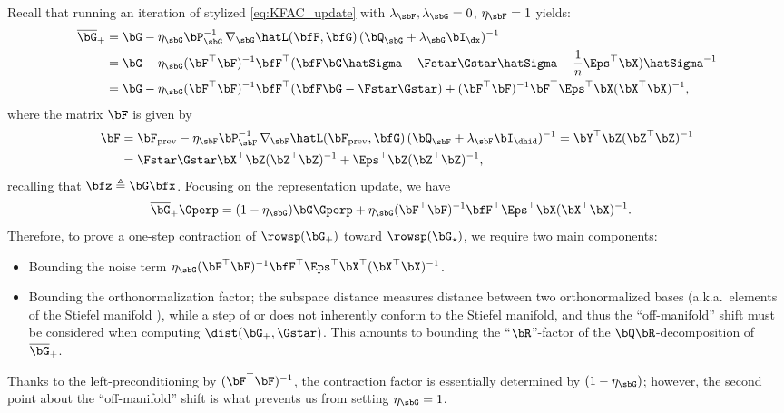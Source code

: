 Recall that running an iteration of stylized \KFAC \eqref{eq:KFAC_update} with $\lambda_\sbF, \lambda_\sbG = 0$, $\eta_\sbF = 1$ yields:
\begin{align}
\begin{split}\label{eq:expanding_KFAC_update}
    \overline\bG_+ &= \bG - \eta_{\sbG} \bP_\sbG^{-1}\, \nabla_{\sbG} \hatL(\bfF, \bfG)\, (\bQ_\sbG + \lambda_\sbG \bI_{\dx})^{-1} \\
    &= \bG - \eta_\sbG (\bF^\top \bF)^{-1}\bfF^\top (\bfF \bG \hatSigma - \Fstar \Gstar \hatSigma - \frac{1}{n}\Eps^\top \bX ) \hatSigma^{-1} \\
    &= \bG - \eta_\sbG (\bF^\top \bF)^{-1}\bfF^\top (\bfF \bG - \Fstar \Gstar) + (\bF^\top \bF)^{-1}\bF^\top\Eps^\top \bX (\bX^\top \bX)^{-1},
\end{split} 
\end{align}
where the matrix $\bF$ is given by
\begin{align*}
        \bF &= \bF_{\rm{prev}} - \eta_\sbF \bP_\sbF^{-1}\, \nabla_\sbF \hatL(\bF_{\rm{prev}}, \bfG)\, (\bQ_{\sbF}+\lambda_\sbF \bI_{\dhid})^{-1} = \bY^\top \bZ (\bZ^\top \bZ)^{-1} \\
        &= \Fstar \Gstar \bX^\top \bZ (\bZ^\top \bZ)^{-1} + \Eps^\top \bZ (\bZ^\top \bZ)^{-1},
\end{align*}
recalling that $\bfz \triangleq \bG \bfx$.
Focusing on the representation update, we have
\begin{align*}
    \overline\bG_+ \Gperp &= (1 - \eta_\sbG) \bG \Gperp + \eta_\sbG (\bF^\top \bF)^{-1}\bfF^\top \Eps^\top \bX (\bX^\top \bX)^{-1}.
\end{align*}
Therefore, to prove a one-step contraction of $\rowsp(\bG_+)$ toward $\rowsp(\bG_\star)$, we require two main components:
\begin{itemize}
    \item Bounding the noise term $\eta_\sbG (\bF^\top \bF)^{-1}\bfF^\top \Eps^\top \bX^\top (\bX^\top \bX)^{-1}$.
    \item Bounding the orthonormalization factor; the subspace distance measures distance between two orthonormalized bases (a.k.a.\ elements of the Stiefel manifold \citep{absil2008optimization}), while a step of \SGD or \KFAC does not inherently conform to the Stiefel manifold, and thus the ``off-manifold'' shift must be considered when computing $\dist(\bG_+, \Gstar)$. This amounts to bounding the ``$\bR$''-factor of the $\bQ\bR$-decomposition \citep{tref2022numerical} of $\overline\bG_+$.
\end{itemize}
Thanks to the left-preconditioning by $(\bF^\top \bF)^{-1}$, the contraction factor is essentially determined by $(1- \eta_\sbG)$; however, the second point about the ``off-manifold'' shift is what prevents us from setting $\eta_\sbG = 1$.

